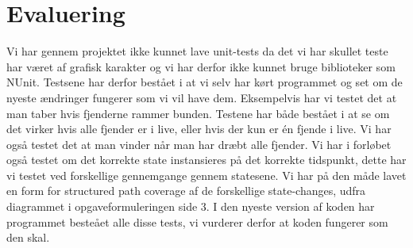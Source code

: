\section{Evaluering}
Vi har gennem projektet ikke kunnet lave unit-tests da det vi har skullet teste har været af grafisk karakter og vi har derfor ikke kunnet bruge biblioteker som NUnit. Testsene har derfor bestået i at vi selv har kørt programmet og set om de nyeste ændringer fungerer som vi vil have dem. Eksempelvis har vi testet det at man taber hvis fjenderne rammer bunden. Testene har både bestået i at se om det virker hvis alle fjender er i live, eller hvis der kun er én fjende i live. Vi har også testet det at man vinder når man har dræbt alle fjender. Vi har i forløbet også testet om det korrekte state instansieres på det korrekte tidspunkt, dette har vi testet ved forskellige gennemgange gennem statesene. Vi har på den måde lavet en form for structured path coverage af de forskellige state-changes, udfra diagrammet i opgaveformuleringen side 3. I den nyeste version af koden har programmet besteået alle disse tests, vi vurderer derfor at koden fungerer som den skal.
